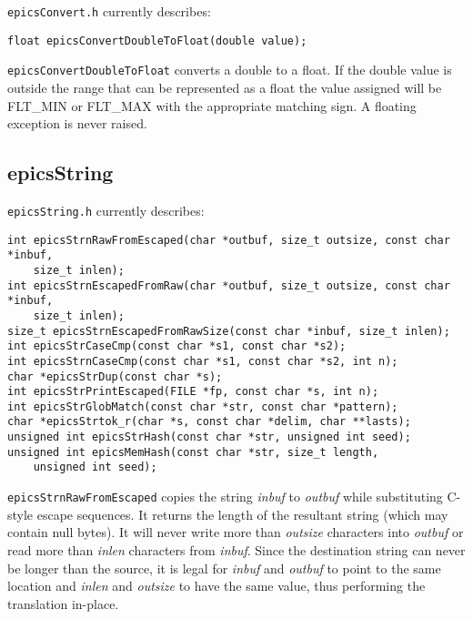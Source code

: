 \verb|epicsConvert.h| currently describes:

\begin{verbatim}
float epicsConvertDoubleToFloat(double value);
\end{verbatim}

\verb|epicsConvertDoubleToFloat| converts a double to a float.
If the double value is outside the range that can be represented as a float the value assigned will be FLT\_MIN or FLT\_MAX with the appropriate matching sign.
A floating exception is never raised.

\subsection{epicsString}

\verb|epicsString.h| currently describes:

\begin{verbatim}
int epicsStrnRawFromEscaped(char *outbuf, size_t outsize, const char *inbuf,
    size_t inlen);
int epicsStrnEscapedFromRaw(char *outbuf, size_t outsize, const char *inbuf,
    size_t inlen);
size_t epicsStrnEscapedFromRawSize(const char *inbuf, size_t inlen);
int epicsStrCaseCmp(const char *s1, const char *s2);
int epicsStrnCaseCmp(const char *s1, const char *s2, int n);
char *epicsStrDup(const char *s);
int epicsStrPrintEscaped(FILE *fp, const char *s, int n);
int epicsStrGlobMatch(const char *str, const char *pattern);
char *epicsStrtok_r(char *s, const char *delim, char **lasts);
unsigned int epicsStrHash(const char *str, unsigned int seed);
unsigned int epicsMemHash(const char *str, size_t length,
    unsigned int seed);
\end{verbatim}

\verb|epicsStrnRawFromEscaped| copies the string \emph{inbuf} to \emph{outbuf} while substituting C-style escape sequences.
It returns the length of the resultant string (which may contain null bytes).
It will never write more than \emph{outsize} characters into \emph{outbuf} or read more than \emph{inlen} characters from \emph{inbuf}.
Since the destination string can never be longer than the source, it is legal for \emph{inbuf} and \emph{outbuf} to point to the same location and \emph{inlen} and \emph{outsize} to have the same value, thus performing the translation in-place.

